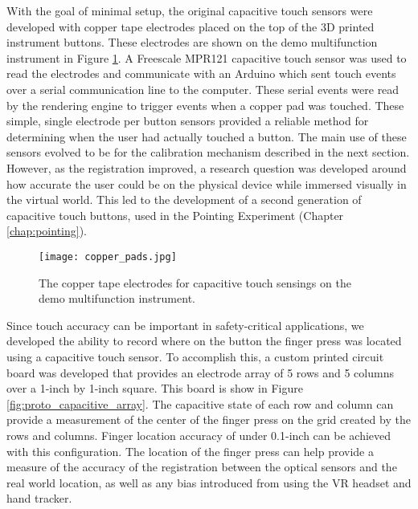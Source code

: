 With the goal of minimal setup, the original capacitive touch sensors were developed with copper tape electrodes placed on the top of the 3D printed instrument buttons.
These electrodes are shown on the demo multifunction instrument in Figure \ref{fig:copper_pads}.
A Freescale MPR121 capacitive touch sensor was used to read the electrodes and communicate with an Arduino which sent touch events over a serial communication line to the computer.
These serial events were read by the rendering engine to trigger events when a copper pad was touched.
These simple, single electrode per button sensors provided a reliable method for determining when the user had actually touched a button.
The main use of these sensors evolved to be for the calibration mechanism described in the next section.
However, as the registration improved, a research question was developed around how accurate the user could be on the physical device while immersed visually in the virtual world.
This led to the development of a second generation of capacitive touch buttons, used in the Pointing Experiment (Chapter \ref{chap:pointing}).

\begin{figure}
    \centering
    \texttt{[image: copper\_pads.jpg]}
    \caption{The copper tape electrodes for capacitive touch sensings on the demo multifunction instrument.}
    \label{fig:copper_pads}
\end{figure}

Since touch accuracy can be important in safety-critical applications, we developed the ability to record where on the button the finger press was located using a capacitive touch sensor.
To accomplish this, a custom printed circuit board was developed that provides an electrode array of 5 rows and 5 columns over a 1-inch by 1-inch square.
This board is show in Figure \ref{fig:proto_capacitive_array}.%
The capacitive state of each row and column can provide a measurement of the center of the finger press on the grid created by the rows and columns.
Finger location accuracy of under 0.1-inch can be achieved with this configuration.
The location of the finger press can help provide a measure of the accuracy of the registration between the optical sensors and the real world location, as well as any bias introduced from using the VR headset and hand tracker.

